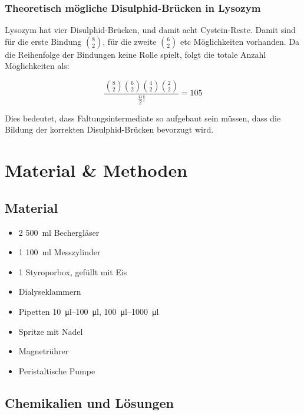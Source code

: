 \documentclass[a4paper,german]{scrreprt}
\begin{document}
\subsection{Theoretisch mögliche Disulphid-Brücken in Lysozym}

Lysozym hat vier Disulphid-Brücken, und damit acht Cystein-Reste. Damit sind
für die erste Bindung $\binom{8}{2}$, für die zweite $\binom{6}{2}$ etc
Möglichkeiten vorhanden. Da die Reihenfolge der Bindungen keine Rolle spielt,
folgt die totale Anzahl Möglichkeiten als:

\[
	\frac{\binom{8}{2} \binom{6}{2} \binom{4}{2} \binom{2}{2}}{\frac{n}{2}!} = 105
\]

Dies bedeutet, dass Faltungsintermediate so aufgebaut sein müssen, dass die
Bildung der korrekten Disulphid-Brücken bevorzugt wird.

\chapter{Material \& Methoden}

\section{Material}

\begin{itemize}
\item 2 \SI{500}{ml} Bechergläser
\item 1 \SI{100}{ml} Messzylinder
\item 1 Styroporbox, gefüllt mit Eis
\item Dialyseklammern
\item Pipetten \SIrange{10}{100}{\ul}, \SIrange{100}{1000}{\ul}
\item Spritze mit Nadel
\item Magnetrührer
\item Peristaltische Pumpe
\end{itemize}

\section{Chemikalien und Lösungen}
\end{document}
